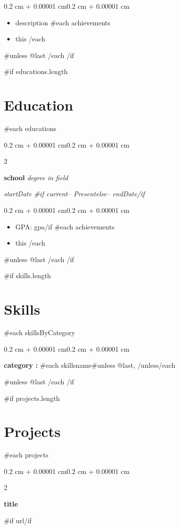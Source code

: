 \documentclass[10pt, letterpaper]{article}
\newenvironment{highlights}{
    \begin{itemize}[
        topsep=0.10 cm,
        parsep=0.10 cm,
        partopsep=0pt,
        itemsep=0pt,
        leftmargin=0.4 cm + 10pt
    ]
}{
    \end{itemize}
}
\newenvironment{onecolentry}{
    \begin{adjustwidth}{0.2 cm + 0.00001 cm}{0.2 cm + 0.00001 cm}
}{
    \end{adjustwidth}
}
\newenvironment{twocolentry}[2][]{
    \onecolentry
    \def\secondColumn{#2}
    \setcolumnwidth{\fill, 4.5 cm}
    \begin{paracol}{2}
}{
    \switchcolumn \raggedleft \secondColumn
    \end{paracol}
    \endonecolentry
}
\let\hrefWithoutArrow\href
\renewcommand{\href}[2]{\hrefWithoutArrow{#1}{\ifthenelse{\equal{#2}{}}{ }{#2 }\raisebox{.15ex}{\footnotesize \faExternalLink*}}}
\begin{document}
    \vspace{0.10 cm}
    \begin{onecolentry}
        \begin{highlights}
            \item {{description}}
            {{#each achievements}}
            \item {{this}}
            {{/each}}
        \end{highlights}
    \end{onecolentry}
    {{#unless @last}}
    {{/each}}
    {{/if}}

    {{#if educations.length}}
    \section{Education}
    {{#each educations}}
    \begin{twocolentry}{
    \textit{ {{startDate}} {{#if current}}– Present{{else}}– {{endDate}}{{/if}} }}
        \textbf{ {{school}} }
        \textit{ {{degree}} in {{field}} }
    \end{twocolentry}

    \vspace{0.10 cm}
    \begin{onecolentry}
        \begin{highlights}
            {{#if gpa}}\item GPA: {{gpa}}{{/if}}
            {{#each achievements}}
            \item {{this}}
            {{/each}}
        \end{highlights}
    \end{onecolentry}
    {{#unless @last}}
    {{/each}}
    {{/if}}

    {{#if skills.length}}
    \section{Skills}
    {{#each skillsByCategory}}
    \begin{onecolentry}
        \textbf{ {{category}} :} {{#each skills}}{{name}}{{#unless @last}}, {{/unless}}{{/each}}
    \end{onecolentry}
    {{#unless @last}}
    {{/each}}
    {{/if}}

    {{#if projects.length}}
    \section{Projects}
    {{#each projects}}
    \begin{twocolentry}{
    {{#if url}}\textit{\href{ {{url}} }{ {{url}} }}{{/if}}
    }
        \textbf{ {{title}} }
    \end{twocolentry}
\end{document}
